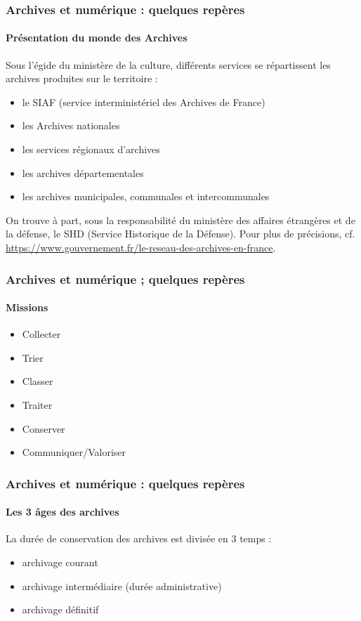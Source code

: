 \documentclass[xcolor=table]{beamer}
\begin{document}
\begin{frame}[plain]
\frametitle{Archives et num\'erique : quelques rep\`eres}
\framesubtitle{Pr\'esentation du monde des Archives}
Sous l'\'egide du minist\`ere de la culture, diff\'erents services se r\'epartissent les archives produites sur le territoire :
\begin{itemize}
    \item le SIAF (service interminist\'eriel des Archives de France)
    \item les Archives nationales
    \item les services r\'egionaux d'archives
    \item les archives d\'epartementales
    \item les archives municipales, communales et intercommunales
\end{itemize}
\newline
\newline
On trouve \`a part, sous la responsabilit\'e du minist\`ere des affaires \'etrang\`eres et de la d\'efense, le SHD (Service Historique de la D\'efense).
\newline
\newline
Pour plus de pr\'ecisions, cf. \url{https://www.gouvernement.fr/le-reseau-des-archives-en-france}.
\end{frame}

\begin{frame}[plain]
\frametitle{Archives et num\'erique ; quelques rep\`eres}
\framesubtitle{Missions}
\begin{itemize}
    \item Collecter
    \item Trier
    \item Classer
    \item Traiter
    \item Conserver
    \item Communiquer/Valoriser
\end{itemize}
\end{frame}

\begin{frame}[plain]
\frametitle{Archives et num\'erique : quelques rep\`eres}
\framesubtitle{Les 3 \^ages des archives}
La dur\'ee de conservation des archives est divis\'ee en 3 temps : 
\begin{itemize}
    \item archivage courant
    \item archivage interm\'ediaire (dur\'ee administrative)
    \item archivage d\'efinitif
\end{itemize}
\end{frame}
\end{document}
